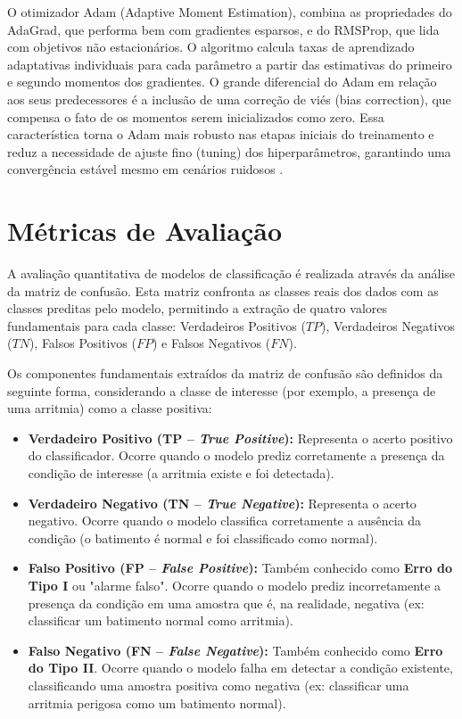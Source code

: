 O otimizador Adam (Adaptive Moment Estimation), combina as propriedades do AdaGrad, que performa bem com gradientes esparsos, e do RMSProp, que lida 
com objetivos não estacionários. O algoritmo calcula taxas de aprendizado adaptativas individuais para cada parâmetro a partir das estimativas do 
primeiro e segundo momentos dos gradientes. O grande diferencial do Adam em relação aos seus 
predecessores é a inclusão de uma correção de viés (bias correction), que compensa o fato de os momentos serem inicializados como zero. Essa 
característica torna o Adam mais robusto nas etapas iniciais do treinamento e reduz a necessidade de ajuste fino (tuning) dos hiperparâmetros, 
garantindo uma convergência estável mesmo em cenários ruidosos .

\section{Métricas de Avaliação}

A avaliação quantitativa de modelos de classificação é realizada através da análise da matriz de confusão. Esta matriz confronta as classes reais dos 
dados com as classes preditas pelo modelo, permitindo a extração de quatro valores fundamentais para cada classe: Verdadeiros Positivos ($TP$), 
Verdadeiros Negativos ($TN$), Falsos Positivos ($FP$) e Falsos Negativos ($FN$).

Os componentes fundamentais extraídos da matriz de confusão são definidos da seguinte forma, considerando a classe de interesse (por exemplo, 
a presença de uma arritmia) como a classe positiva:

\begin{itemize}
    \item \textbf{Verdadeiro Positivo (TP -- \textit{True Positive}):} Representa o acerto positivo do classificador. Ocorre quando o modelo prediz 
    corretamente a presença da condição de interesse (a arritmia existe e foi detectada).
    
    \item \textbf{Verdadeiro Negativo (TN -- \textit{True Negative}):} Representa o acerto negativo. Ocorre quando o modelo classifica corretamente a 
    ausência da condição (o batimento é normal e foi classificado como normal).
    
    \item \textbf{Falso Positivo (FP -- \textit{False Positive}):} Também conhecido como \textbf{Erro do Tipo I} ou "alarme falso". Ocorre quando o 
    modelo prediz incorretamente a presença da condição em uma amostra que é, na realidade, negativa (ex: classificar um batimento normal como arritmia).
    
    \item \textbf{Falso Negativo (FN -- \textit{False Negative}):} Também conhecido como \textbf{Erro do Tipo II}. Ocorre quando o modelo falha em 
    detectar a condição existente, classificando uma amostra positiva como negativa (ex: classificar uma arritmia perigosa como um batimento normal).
\end{itemize}


